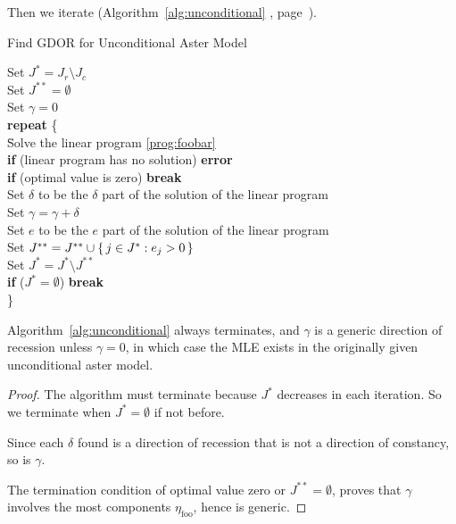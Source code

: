 Then we iterate
(Algorithm~\ref{alg:unconditional}
{, page~\pageref{alg:unconditional}).}
\begin{algorithm}
\caption{Find GDOR for Unconditional Aster Model}
\label{alg:unconditional}
\begin{tabbing}
Set $J^{*} = J_r \setminus J_c$\\
Set $J^{{*}{*}} = \emptyset$\\
Set $\gamma = 0$\\
\textbf{repeat} \{\\
\qquad \= Solve the linear program \eqref{prog:foobar}\\
\> \textbf{if} (linear program has no solution) \textbf{error}\\
\> \textbf{if} (optimal value is zero) \textbf{break}\\
\> Set $\delta$ to be the $\delta$ part of the solution of the linear program\\
\> Set $\gamma = \gamma + \delta$\\
\> Set $e$ to be the $e$ part of the solution of the linear program\\
\> Set $J^{**} = J^{**} \cup \{\, j \in J^{*} : e_j > 0 \,\}$\\
\> Set $J^{*} = J^{*} \setminus J^{{*}{*}}$\\
\> \textbf{if} ($J^{*} = \emptyset$) \textbf{break}\\
\}
\end{tabbing}
\end{algorithm}
\begin{theorem} \label{th:lin-prog-two}
Algorithm~\ref{alg:unconditional} always terminates, and $\gamma$ is
a generic direction of recession unless $\gamma = 0$, in which case
the MLE exists in the originally given unconditional aster model.
\end{theorem}
\begin{proof}
The algorithm must terminate because $J^{*}$ decreases in each iteration.
So we terminate when $J^{*} = \emptyset$ if not before.

Since each $\delta$ found is a direction of recession that is not
a direction of constancy, so is $\gamma$.

The termination condition of optimal value zero or $J^{{*}{*}} = \emptyset$,
proves that $\gamma$ involves the most components $\eta_\text{foo}$, hence
is generic.
\end{proof}
